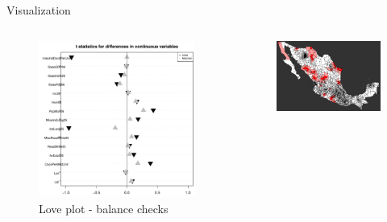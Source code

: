 \documentclass[final]{beamer}
\newlength{\onecolwid}
\newlength{\twocolwid}
\begin{document}
\begin{frame}[t]
\begin{columns}[t]
\begin{column}{\twocolwid}
\begin{block}{ Visualization }
\begin{columns}[t,totalwidth=\twocolwid]
          \begin{column}{\onecolwid}
            \begin{figure}[htdp]
              \includegraphics[scale=1]{../Images/FinalLoveplot.pdf}
              \caption*{Love plot - balance checks}
            \end{figure}
          \end{column}
   			\begin{column}{\onecolwid}
             \begin{figure}[htdp]
 	              \includegraphics[scale=0.95]{intervened.png}

\end{figure}
\end{column}
\end{columns}
\end{block}
\end{column}
\end{columns}
\end{frame}
\end{document}
